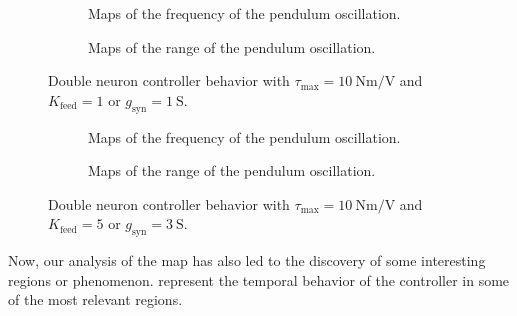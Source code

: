 \begin{figure}[!htbp]
    \centering
    \begin{subfigure}[t][.46\textheight][b]{\textwidth}
        \centering
        \caption{Maps of the frequency of the pendulum oscillation.}
        \label{fig:double_t10_low_freq}
    \end{subfigure}
    
    \begin{subfigure}[b][.46\textheight][t]{\textwidth}
        \centering
        \caption{Maps of the range of the pendulum oscillation.}
        \label{fig:double_t10_low_range}
    \end{subfigure}
    \caption{Double neuron controller behavior with $\tau_\text{max} = \qty{10}{\newton\meter\per\volt}$ and $K_\text{feed} = 1$ or $g_{\text{syn}} = \qty{1}{\siemens}$.}
    \label{fig:double_t10_low}
\end{figure}

\begin{figure}[!htbp]
    \centering
    \begin{subfigure}[t][.46\textheight][b]{\textwidth}
        \centering
        \caption{Maps of the frequency of the pendulum oscillation.}
        \label{fig:double_t10_high_freq}
    \end{subfigure}
    
    \begin{subfigure}[b][.46\textheight][t]{\textwidth}
        \centering
        \caption{Maps of the range of the pendulum oscillation.}
        \label{fig:double_t10_high_range}
    \end{subfigure}
    \caption{Double neuron controller behavior with $\tau_\text{max} = \qty{10}{\newton\meter\per\volt}$ and $K_\text{feed} = 5$ or $g_{\text{syn}} = \qty{3}{\siemens}$.}
    \label{fig:double_t10_high}
\end{figure}

Now, our analysis of the map has also led to the discovery of some interesting regions or phenomenon. 
 represent the temporal behavior of the controller in some of the most relevant regions.

